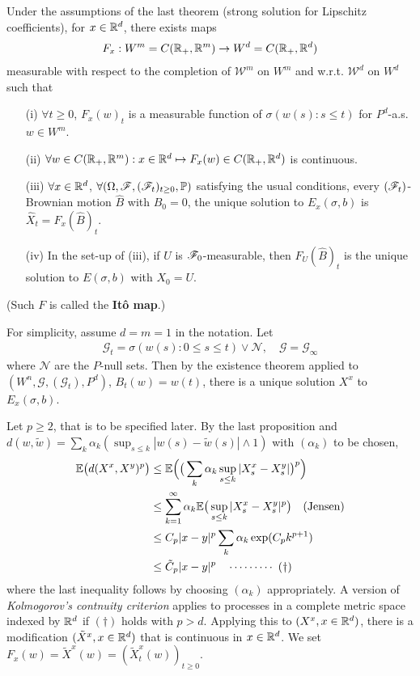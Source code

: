 \documentclass[12pt,a4paper]{article}
\newenvironment{proof}
{\begin{changemargin}{0.5cm}{0.5cm} 
	}%
	{\end{changemargin}
}
\newenvironment{p}
{\begin{proof} 
	}%
	{\end{proof}
}
\begin{document}
\thm Under the assumptions of the last theorem (strong solution for Lipschitz coefficients), for $x\in\mathbb{R}^d$, there exists maps
\begin{align*}
F_x : W^m = C(\mathbb{R}_+ , \mathbb{R}^m) \rightarrow W^d = C(\mathbb{R}_+, \mathbb{R}^d)
\end{align*}
measurable with respect to the completion of $\mathscr{W}^m$ on $W^m$ and w.r.t. $\mathscr{W}^d$ on $W^d$ such that
\begin{itemize}
\item[(i)] $\forall t\geq 0$, $F_x(w)_t$ is a measurable function of $\sigma (w(s) : s\leq t)$ for $P^d$-a.s. $w \in W^m$.
\item[(ii)] $\forall w\in C(\mathbb{R}_+, \mathbb{R}^m) : x\in \mathbb{R}^d \mapsto F_x(w) \in C(\mathbb{R}_+, \mathbb{R}^d)$ is continuous.
\item[(iii)] $\forall x\in \mathbb{R}^d$, $\forall (\Omega, \mathscr{F}, (\mathscr{F}_t)_{t\geq 0}, \mathbb{P})$ satisfying the usual conditions, every $(\mathscr{F}_t)$-Brownian motion $\hat{B}$ with $\hat{B}_0 =0$, the unique solution to $E_x(\sigma, b)$ is $\hat{X}_t = F_x(\hat{B})_t$.
\item[(iv)] In the set-up of (iii), if $U$ is $\mathscr{F}_0$-measurable, then $F_U(\hat{B})_t$ is the unique solution to $E(\sigma, b)$ with $X_0 =U$.
\end{itemize}
(Such $F$ is called the \textbf{It\^o map}.)
\begin{p}
\pf For simplicity, assume $d=m=1$ in the notation. Let
\begin{align*}
\mathscr{G}_t = \sigma(w(s) : 0\leq s\leq t) \vee \mathscr{N}, \quad \mathscr{G} = \mathscr{G}_{\infty}
\end{align*}
where $\mathscr{N}$ are the $P$-null sets. Then by the existence theorem applied to $(W^n, \mathscr{G}, (\mathscr{G}_t), P^d)$, $B_t(w) = w(t)$, there is a unique solution $X^x$ to $E_x(\sigma, b)$.

\quad Let $p\geq 2$, that is to be specified later. By the last proposition and $d(w, \tilde{w}) = \sum_{k} \alpha_k ( \sup_{s\leq k} |w(s)- \tilde{w}(s)| \wedge 1)$ with $(\alpha_k)$ to be chosen,
\begin{align*}
\mathbb{E} \big( d(X^x , X^y)^p \big) & \leq \mathbb{E} \Big( \big( \sum_k \alpha_k \sup_{s\leq k} |X_s^x - X_s^y| \big)^p \Big) \\
& \leq \sum_{k=1}^{\infty} \alpha_k \mathbb{E} \big( \sup_{s\leq k} |X_s^x - X_s^y|^p \big) \quad \text{(Jensen)} \\
& \leq C_p |x-y|^p \sum_{k} \alpha_k \exp ( C_p  k^{p+1})  \\
& \leq \tilde{C}_p |x-y|^p \quad \cdots\cdots\cdots\,\,(\dagger)
\end{align*}
where the last inequality follows by choosing $(\alpha_k)$ appropriately. A version of \emph{Kolmogorov's contnuity criterion} applies to processes in a complete metric space indexed by $\mathbb{R}^d$ if $(\dagger)$ holds with $p>d$. Applying this to $(X^x, x\in \mathbb{R}^d)$, there is a modification $(\tilde{X}^x, x\in \mathbb{R}^d)$ that is continuous in $x\in \mathbb{R}^d$. We set $F_x(w) = \tilde{X}^x(w) = (\tilde{X}^x_t (w))_{t \geq 0}$.
\end{p}
\s
\end{document}
